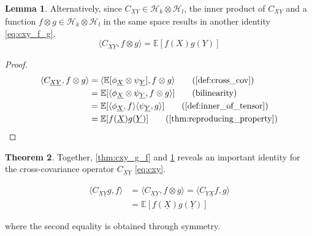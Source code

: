 \documentclass[twoside]{article} \usepackage{aistats2017}
\theoremstyle{definition}
\newtheorem{theorem}{Theorem}[section]
\newtheorem{lemma}[theorem]{Lemma}
\newcommand{\rv}[1]{\underline{#1}}
\newcommand{\expect}[1]{{\mathbb{E}[#1]}}
\newcommand{\inner}[2]{{\langle #1, #2 \rangle}}
\newcommand{\phiX}{\phi_{\rv{X}}}
\newcommand{\psiY}{\psi_{\rv{Y}}}
\newcommand{\Cxy}{C_{\rv{X} \rv{Y}}}
\newcommand{\Cyx}{C_{\rv{Y} \rv{X}}}
\begin{document}
	\begin{lemma} \label{thm:cxy_f_g}
		Alternatively, since $\Cxy \in \mathcal{H}_{k} \otimes \mathcal{H}_{l}$, the inner product of $\Cxy$ and a function $f \otimes g \in \mathcal{H}_{k} \otimes \mathcal{H}_{l}$ in the same space results in another identity \eqref{eq:cxy_f_g}.
		\begin{equation}
			\inner{\Cxy}{f \otimes g} = \expect{f(X) g(Y)}
		\label{eq:cxy_f_g}
		\end{equation}
		
		\begin{proof}
		\begin{align*}
			\inner{\Cxy}{f \otimes g} &= \inner{\expect{\phiX \otimes \psiY}}{f \otimes g} \tag{\cref{def:cross_cov}} \\
			&= \expect{\inner{\phiX \otimes \psiY}{f \otimes g}} \tag{bilinearity} \\
			&= \expect{\inner{\phiX}{f} \inner{\psiY}{g}} \tag{\cref{def:inner_of_tensor}}\\
			&= \expect{f(\rv{X}) g(\rv{Y})} \tag{\cref{thm:reproducing_property}}
		\end{align*}
		\end{proof}			
	\end{lemma}
	
	\begin{theorem}
		Together, \cref{thm:cxy_g_f} and \cref{thm:cxy_f_g} reveals an important identity for the cross-covariance operator $\Cxy$ \eqref{eq:cxy}.
		
		\begin{equation}
		\begin{aligned}
			 \inner{\Cxy g}{f} &= \inner{\Cxy}{f \otimes g} = \inner{\Cyx f}{g} \\
			 &= \expect{f(\rv{X}) g(\rv{Y})}
			 \label{eq:cxy}			
		\end{aligned}
		\end{equation}
		
		where the second equality is obtained through symmetry. \\
	\end{theorem}
\end{document}
